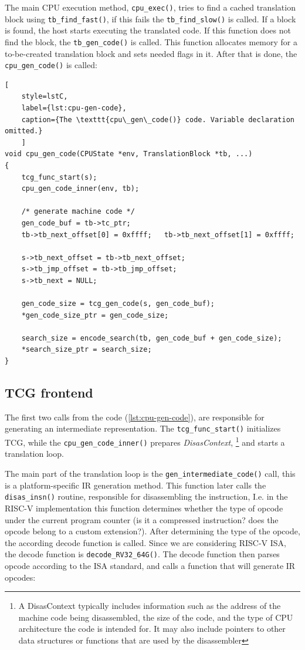 The main CPU execution method, \texttt{cpu\_exec()}, tries to find a cached translation block using
\texttt{tb\_find\_fast()}, if this fails the \texttt{tb\_find\_slow()} is called. If a block is found, the host starts
executing the translated code. If this function does not find the block, the \texttt{tb\_gen\_code()} is called.
This function allocates memory for a to-be-created translation block and sets needed flags in it. After that is done,
the \texttt{cpu\_gen\_code()} is called:

\nopagebreak[4]
\begin{lstlisting}[
    style=lstC,
    label={lst:cpu-gen-code},
    caption={The \texttt{cpu\_gen\_code()} code. Variable declaration omitted.}
    ]
void cpu_gen_code(CPUState *env, TranslationBlock *tb, ...)
{
    tcg_func_start(s);
    cpu_gen_code_inner(env, tb);

    /* generate machine code */
    gen_code_buf = tb->tc_ptr;
    tb->tb_next_offset[0] = 0xffff;   tb->tb_next_offset[1] = 0xffff;

    s->tb_next_offset = tb->tb_next_offset;
    s->tb_jmp_offset = tb->tb_jmp_offset;
    s->tb_next = NULL;

    gen_code_size = tcg_gen_code(s, gen_code_buf);
    *gen_code_size_ptr = gen_code_size;

    search_size = encode_search(tb, gen_code_buf + gen_code_size);
    *search_size_ptr = search_size;
}
\end{lstlisting}

\subsection{TCG frontend}
\label{sec:tcg-frontend}

The first two calls from the code (\ref{lst:cpu-gen-code}), are responsible for generating an intermediate
representation. The \texttt{tcg\_func\_start()} initializes TCG, while the \texttt{cpu\_gen\_code\_inner()} prepares
\textit{DisasContext},%
\footnote{A DisasContext typically includes information such as the address of the machine code being disassembled,
the size of the code, and the type of CPU architecture the code is intended for. It may also include pointers to other
data structures or functions that are used by the disassembler}
and starts a translation loop.

The main part of the translation loop is the \texttt{gen\_intermediate\_code()} call, this is a platform-specific
IR generation method. This function later calls the \texttt{disas\_insn()} routine, responsible for disassembling
the instruction, I.e. in the RISC-V implementation this function determines whether the type of opcode under the current
program counter (is it a compressed instruction? does the opcode belong to a custom extension?). After determining
the type of the opcode, the according decode function is called. Since we are considering RISC-V ISA, the decode function
is \texttt{decode\_RV32\_64G()}. The decode function then parses opcode according to the ISA standard, and calls a
function that will generate IR opcodes:


